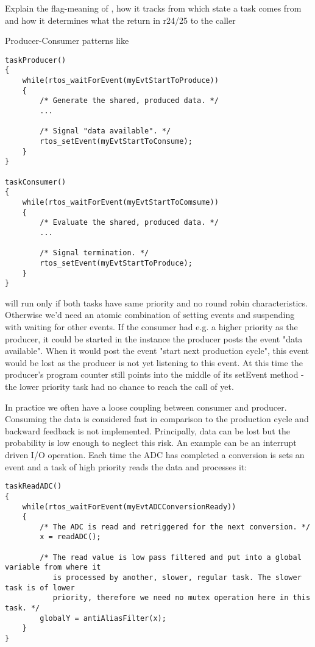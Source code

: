 Explain the flag-meaning of , how it tracks from which
state a task comes from and how it determines what the return in r24/25 to
the caller

Producer-Consumer patterns like
\begin{lstlisting}[float, caption=Deadlock situation in a producer/consumer implementation,
label=lstProducerConsumer, captionpos=b]
taskProducer()
{
    while(rtos_waitForEvent(myEvtStartToProduce))
    {
        /* Generate the shared, produced data. */
        ...

        /* Signal "data available". */
        rtos_setEvent(myEvtStartToConsume);
    }
}

taskConsumer()
{
    while(rtos_waitForEvent(myEvtStartToComsume))
    {
        /* Evaluate the shared, produced data. */
        ...

        /* Signal termination. */
        rtos_setEvent(myEvtStartToProduce);
    }
}
\end{lstlisting}
will run only if both tasks have same priority and no round robin characteristics.
Otherwise we'd need an atomic combination of setting events and suspending with waiting for
other events. If the consumer had e.g. a higher priority as the producer, it could be
started in the instance the producer posts the event "data available". When it would post
the event "start next production cycle", this event would be lost as the producer is not
yet listening to this event. At this time the producer's program counter still points into
the middle of its setEvent method - the lower priority task had no chance to reach the call
of  yet.

In practice we often have a loose coupling between consumer and producer. Consuming the
data is considered fast in comparison to the production cycle and backward feedback is not
implemented. Principally, data can be lost but the probability is low enough to neglect
this risk. An example can be an interrupt driven I/O operation. Each time the ADC has
completed a conversion is sets an event and a task of high priority reads the data and
processes it:
\begin{lstlisting}[float, caption=Usage of application interrupts,
label=lstSampleISRForADC, captionpos=b]
taskReadADC()
{
    while(rtos_waitForEvent(myEvtADCConversionReady))
    {
        /* The ADC is read and retriggered for the next conversion. */
        x = readADC();
        
        /* The read value is low pass filtered and put into a global variable from where it
           is processed by another, slower, regular task. The slower task is of lower
           priority, therefore we need no mutex operation here in this task. */
        globalY = antiAliasFilter(x);
    }        
}
\end{lstlisting}


